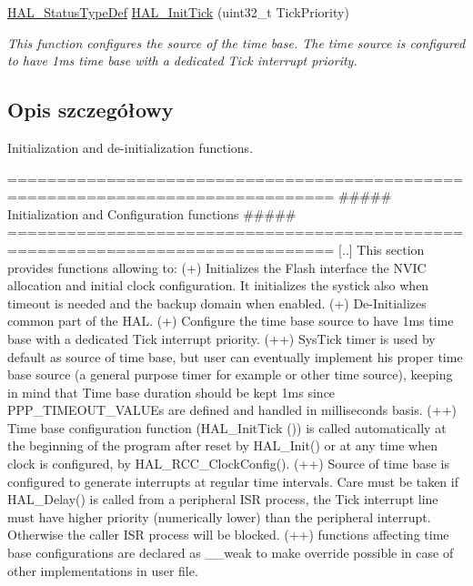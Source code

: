 \begin{DoxyCompactItemize}
\hyperlink{stm32f4xx__hal__def_8h_a63c0679d1cb8b8c684fbb0632743478f}{H\+A\+L\+\_\+\+Status\+Type\+Def} \hyperlink{group___h_a_l___exported___functions___group1_ga44d1542f9985b2243b14a41070cc41cc}{H\+A\+L\+\_\+\+Init\+Tick} (uint32\+\_\+t Tick\+Priority)
\begin{DoxyCompactList}\small\item\em This function configures the source of the time base. The time source is configured to have 1ms time base with a dedicated Tick interrupt priority. \end{DoxyCompactList}\end{DoxyCompactItemize}


\subsection{Opis szczegółowy}
Initialization and de-\/initialization functions. 

\begin{DoxyVerb} ===============================================================================
              ##### Initialization and Configuration functions #####
 ===============================================================================
    [..]  This section provides functions allowing to:
      (+) Initializes the Flash interface the NVIC allocation and initial clock 
          configuration. It initializes the systick also when timeout is needed 
          and the backup domain when enabled.
      (+) De-Initializes common part of the HAL.
      (+) Configure the time base source to have 1ms time base with a dedicated 
          Tick interrupt priority. 
        (++) SysTick timer is used by default as source of time base, but user
             can eventually implement his proper time base source (a general purpose 
             timer for example or other time source), keeping in mind that Time base 
             duration should be kept 1ms since PPP_TIMEOUT_VALUEs are defined and 
             handled in milliseconds basis.
        (++) Time base configuration function (HAL_InitTick ()) is called automatically 
             at the beginning of the program after reset by HAL_Init() or at any time 
             when clock is configured, by HAL_RCC_ClockConfig(). 
        (++) Source of time base is configured  to generate interrupts at regular 
             time intervals. Care must be taken if HAL_Delay() is called from a 
             peripheral ISR process, the Tick interrupt line must have higher priority 
            (numerically lower) than the peripheral interrupt. Otherwise the caller 
            ISR process will be blocked. 
       (++) functions affecting time base configurations are declared as __weak  
             to make  override possible  in case of other  implementations in user file.
\end{DoxyVerb}
 

